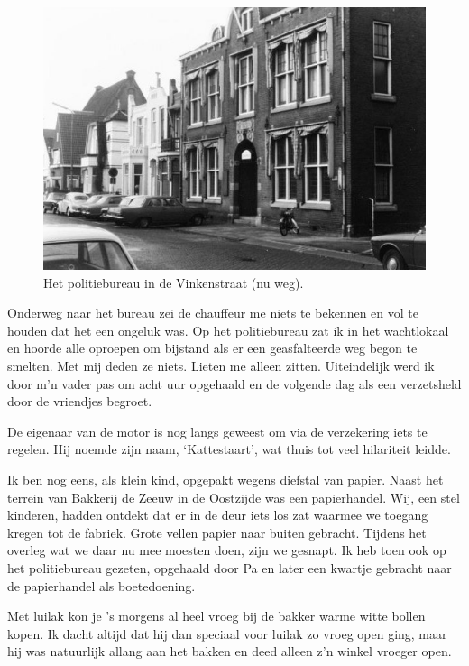 \documentclass[12pt,twoside, openright]{memoir}
\begin{document}
\begin{figure}
\centering
\includegraphics[width=\textwidth]{img/ch9/politburo}
\caption*{\footnotesize Het politiebureau in de Vinkenstraat (nu weg).}
\end{figure}

Onderweg naar het bureau zei de chauffeur me niets te bekennen en vol te houden dat het een ongeluk was. Op het politiebureau zat ik in het wachtlokaal en hoorde alle oproepen om bijstand als er een geasfalteerde weg begon te smelten. Met mij deden ze niets. Lieten me alleen zitten. Uiteindelijk werd ik door m’n vader pas om acht uur opgehaald en de volgende dag als een verzetsheld door de vriendjes begroet. 

De eigenaar van de motor is nog langs geweest om via de verzekering iets te regelen. Hij noemde zijn naam, `Kattestaart', wat thuis tot veel hilariteit leidde. 

Ik ben nog eens, als klein kind, opgepakt wegens diefstal van papier. Naast het terrein van Bakkerij de Zeeuw in de Oostzijde was een papierhandel. Wij, een stel kinderen, hadden ontdekt dat er in de deur iets los zat waarmee we toegang kregen tot de fabriek. Grote vellen papier naar buiten gebracht. Tijdens het overleg wat we daar nu mee moesten doen, zijn we gesnapt. Ik heb toen ook op het politiebureau gezeten, opgehaald door Pa en later een kwartje gebracht naar de papierhandel als boetedoening.

Met luilak kon je ’s morgens al heel vroeg bij de bakker warme witte bollen kopen. Ik dacht altijd dat hij dan speciaal voor luilak zo vroeg open ging, maar hij was natuurlijk allang aan het bakken en deed alleen z’n winkel vroeger open. 
\end{document}
